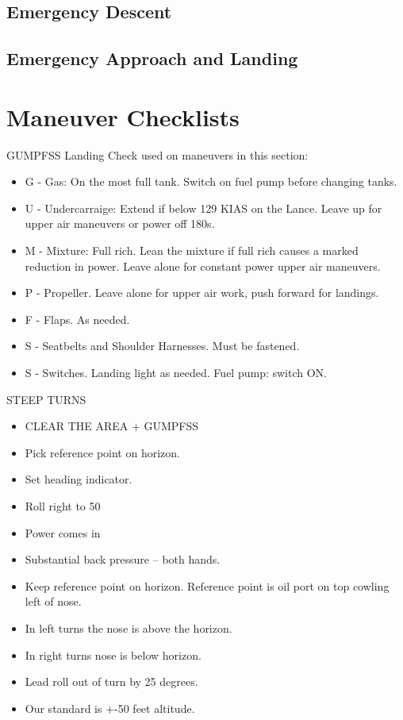 \subsection{Emergency Descent}

\subsection{Emergency Approach and Landing}

\section{Maneuver Checklists}

GUMPFSS Landing Check used on maneuvers in this section:
\begin{itemize}
    \item G - Gas: On the most full tank. Switch on fuel pump before changing tanks.
    \item U - Undercarraige: Extend if below 129 KIAS on the Lance. Leave up for upper air maneuvers or power off 180s.
    \item M - Mixture: Full rich. Lean the mixture if full rich causes a marked reduction in power. Leave alone for constant power upper air maneuvers.
    \item P - Propeller. Leave alone for upper air work, push forward for landings.
    \item F - Flaps. As needed.
    \item S - Seatbelts and Shoulder Harnesses. Must be fastened.
    \item S - Switches. Landing light as needed. Fuel pump: switch ON.

\end{itemize}

STEEP TURNS
\begin{itemize}
    \item CLEAR THE AREA + GUMPFSS
    \item Pick reference point on horizon.
    \item Set heading indicator.
    \item Roll right to 50
    \item Power comes in
    \item Substantial back pressure – both hands.
    \item Keep reference point on horizon. Reference point is oil port on top cowling left of nose.
    \item In left turns the nose is above the horizon.
    \item In right turns nose is below horizon.
    \item Lead roll out of turn by 25 degrees.
    \item Our standard is +-50 feet altitude.
\end{itemize}

